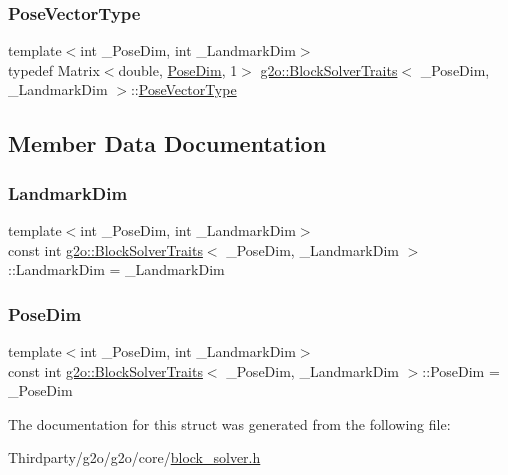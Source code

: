 \subsubsection{\texorpdfstring{Pose\+Vector\+Type}{PoseVectorType}}
{\footnotesize\ttfamily template$<$int \+\_\+\+Pose\+Dim, int \+\_\+\+Landmark\+Dim$>$ \\
typedef Matrix$<$double, \mbox{\hyperlink{structg2o_1_1_block_solver_traits_a90a03bcfc60b629da5601f6df9514297}{Pose\+Dim}}, 1$>$ \mbox{\hyperlink{structg2o_1_1_block_solver_traits}{g2o\+::\+Block\+Solver\+Traits}}$<$ \+\_\+\+Pose\+Dim, \+\_\+\+Landmark\+Dim $>$\+::\mbox{\hyperlink{structg2o_1_1_block_solver_traits_a032ed57e9bc44c36093f97b32e1506f6}{Pose\+Vector\+Type}}}



\subsection{Member Data Documentation}
\mbox{\label{structg2o_1_1_block_solver_traits_a7e6e33971e5243e020a9f41cd3182218}} 
\subsubsection{\texorpdfstring{Landmark\+Dim}{LandmarkDim}}
{\footnotesize\ttfamily template$<$int \+\_\+\+Pose\+Dim, int \+\_\+\+Landmark\+Dim$>$ \\
const int \mbox{\hyperlink{structg2o_1_1_block_solver_traits}{g2o\+::\+Block\+Solver\+Traits}}$<$ \+\_\+\+Pose\+Dim, \+\_\+\+Landmark\+Dim $>$\+::Landmark\+Dim = \+\_\+\+Landmark\+Dim\hspace{0.3cm}{\ttfamily [static]}}

\mbox{\label{structg2o_1_1_block_solver_traits_a90a03bcfc60b629da5601f6df9514297}} 
\subsubsection{\texorpdfstring{Pose\+Dim}{PoseDim}}
{\footnotesize\ttfamily template$<$int \+\_\+\+Pose\+Dim, int \+\_\+\+Landmark\+Dim$>$ \\
const int \mbox{\hyperlink{structg2o_1_1_block_solver_traits}{g2o\+::\+Block\+Solver\+Traits}}$<$ \+\_\+\+Pose\+Dim, \+\_\+\+Landmark\+Dim $>$\+::Pose\+Dim = \+\_\+\+Pose\+Dim\hspace{0.3cm}{\ttfamily [static]}}



The documentation for this struct was generated from the following file\+:\begin{DoxyCompactItemize}
\item 
Thirdparty/g2o/g2o/core/\mbox{\hyperlink{block__solver_8h}{block\+\_\+solver.\+h}}\end{DoxyCompactItemize}
